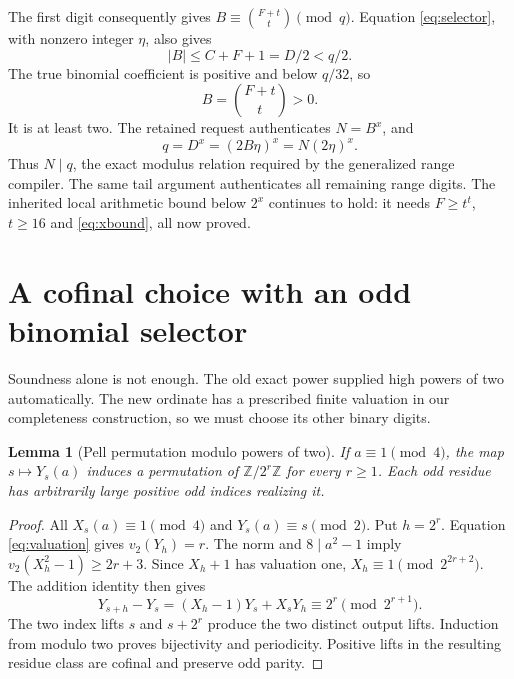 \documentclass[11pt,a4paper]{article}
\newtheorem{lemma}[theorem]{Lemma}
\theoremstyle{remark}\newtheorem{remark}[theorem]{Remark}
\newcommand{\Z}{\mathbb Z}
\newcommand{\vp}{v_2}
\begin{document}
The first digit consequently gives $B\equiv\binom{F+t}{t}\pmod q$.
Equation \eqref{eq:selector}, with nonzero integer $\eta$, also gives
\[
|B|\le C+F+1=D/2<q/2.
\]
The true binomial coefficient is positive and below $q/32$, so
\begin{equation}\label{eq:Bexact}
B=\binom{F+t}{t}>0.
\end{equation}
It is at least two. The retained request authenticates $N=B^x$, and
\[
q=D^x=(2B\eta)^x=N(2\eta)^x.
\]
Thus $N\mid q$, the exact modulus relation required by the generalized
range compiler. The same tail argument authenticates all remaining range
digits. The inherited local arithmetic bound below $2^x$ continues to hold:
it needs $F\ge t^t$, $t\ge16$ and \eqref{eq:xbound}, all now proved.

\section{A cofinal choice with an odd binomial selector}\label{sec:cofinal}

Soundness alone is not enough. The old exact power supplied high powers of
two automatically. The new ordinate has a prescribed finite valuation in our
completeness construction, so we must choose its other binary digits.

\begin{lemma}[Pell permutation modulo powers of two]\label{lem:permutation}
If $a\equiv1\pmod4$, the map $s\mapsto Y_s(a)$ induces a permutation of
$\Z/2^r\Z$ for every $r\ge1$. Each odd residue has arbitrarily large
positive odd indices realizing it.
\end{lemma}
\begin{proof}
All $X_s(a)\equiv1\pmod4$ and $Y_s(a)\equiv s\pmod2$. Put $h=2^r$.
Equation \eqref{eq:valuation} gives $\vp(Y_h)=r$. The norm and
$8\mid a^2-1$ imply $\vp(X_h^2-1)\ge2r+3$. Since $X_h+1$ has valuation
one, $X_h\equiv1\pmod{2^{2r+2}}$. The addition identity then gives
\[
Y_{s+h}-Y_s=(X_h-1)Y_s+X_sY_h\equiv2^r\pmod{2^{r+1}}.
\]
The two index lifts $s$ and $s+2^r$ produce the two distinct output lifts.
Induction from modulo two proves bijectivity and periodicity. Positive lifts
in the resulting residue class are cofinal and preserve odd parity.
\end{proof}
\end{document}
